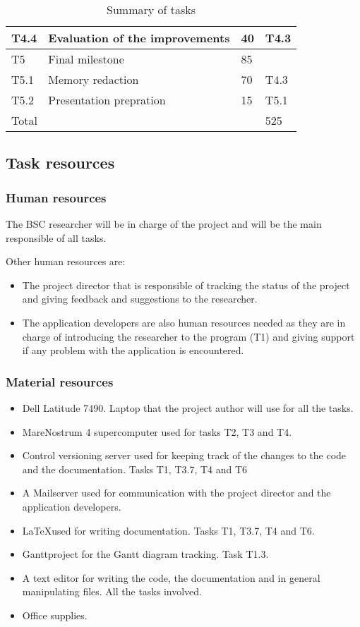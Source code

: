 \begin{table}[htbp]
\begin{tabular}{llll}
T4.4 & Evaluation of the improvements                   & 40       & T4.3         \\ \hline
T5   & Final milestone                                  & 85       &              \\ \hline
T5.1 & Memory redaction                                 & 70       & T4.3         \\
T5.2 & Presentation prepration                          & 15       & T5.1         \\ \hline
\multicolumn{3}{l}{Total}                                          & 525         
\end{tabular}
\caption{Summary of tasks}
\label{tab:tasks}
\end{table}

\subsection{Task resources}

\subsubsection{Human resources}

The BSC researcher will be in charge of the project and will be the main responsible of all tasks.

Other human resources are:
\begin{itemize}
  \item The project director that is responsible of tracking the status of the project and giving feedback and suggestions to the researcher.
  \item The application developers are also human resources needed as they are in charge of introducing the researcher to the program (T1) and giving support if any problem with the application is encountered.
\end{itemize}

\subsubsection{Material resources}

\begin{itemize}
  \item Dell Latitude 7490. Laptop that the project author will use for all the tasks.
  \item MareNostrum 4 supercomputer used for tasks T2, T3 and T4.
  \item Control versioning server used for keeping track of the changes to the code and the documentation. Tasks T1, T3.7, T4 and T6
  \item A Mailserver used for communication with the project director and the application developers.
  \item \LaTeX used for writing documentation. Tasks T1, T3.7, T4 and T6.
  \item Ganttproject for the Gantt diagram tracking. Task T1.3.
  \item A text editor for writing the code, the documentation and in general manipulating files. All the tasks involved.
  \item Office supplies.
\end{itemize}
